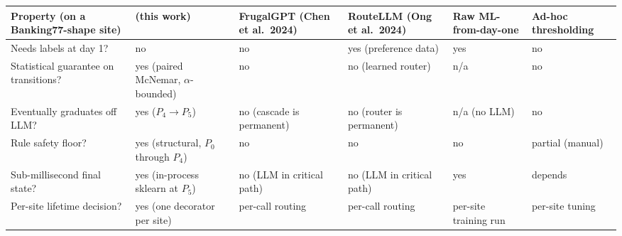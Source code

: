 {\def\LTcaptype{none} %
\begin{longtable}[]{@{}
  >{\raggedright\arraybackslash}p{}
  >{\centering\arraybackslash}p{}
  >{\centering\arraybackslash}p{}
  >{\centering\arraybackslash}p{}
  >{\centering\arraybackslash}p{}
  >{\centering\arraybackslash}p{}@{}}
\toprule\noalign{}
\begin{minipage}[b]{\linewidth}\raggedright
Property (on a Banking77-shape site)
\end{minipage} & \begin{minipage}[b]{\linewidth}\centering
\sysname{} (this work)
\end{minipage} & \begin{minipage}[b]{\linewidth}\centering
FrugalGPT (Chen et al.~2024)
\end{minipage} & \begin{minipage}[b]{\linewidth}\centering
RouteLLM (Ong et al.~2024)
\end{minipage} & \begin{minipage}[b]{\linewidth}\centering
Raw ML-from-day-one
\end{minipage} & \begin{minipage}[b]{\linewidth}\centering
Ad-hoc thresholding
\end{minipage} \\
\midrule\noalign{}
\endhead
\bottomrule\noalign{}
\endlastfoot
Needs labels at day 1? & no & no & yes (preference data) & yes & no \\
Statistical guarantee on transitions? & yes (paired McNemar,
\(\alpha\)-bounded) & no & no (learned router) & n/a & no \\
Eventually graduates off LLM? & yes (\(P_4 \to P_5\)) & no (cascade is
permanent) & no (router is permanent) & n/a (no LLM) & no \\
Rule safety floor? & yes (structural, \(P_0\) through \(P_4\)) & no & no
& no & partial (manual) \\
Sub-millisecond final state? & yes (in-process sklearn at \(P_5\)) & no
(LLM in critical path) & no (LLM in critical path) & yes & depends \\
Per-site lifetime decision? & yes (one decorator per site) & per-call
routing & per-call routing & per-site training run & per-site tuning \\
\end{longtable}
}

